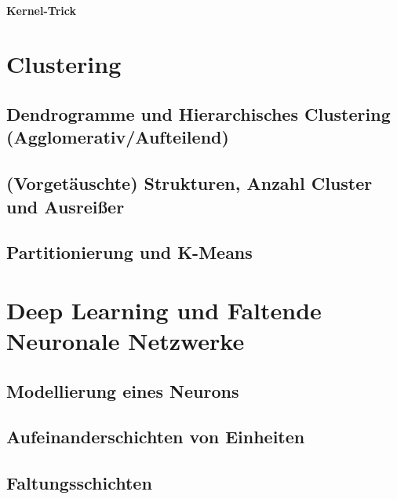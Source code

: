 			\subsubsection{Kernel-Trick} %

\chapter{Clustering} %

	\section{Dendrogramme und Hierarchisches Clustering (Agglomerativ/Aufteilend)} %

	\section{(Vorgetäuschte) Strukturen, Anzahl Cluster und Ausreißer} %

	\section{Partitionierung und K-Means} %

\chapter{Deep Learning und Faltende Neuronale Netzwerke} %

	\section{Modellierung eines Neurons} %

	\section{Aufeinanderschichten von Einheiten} %

	\section{Faltungsschichten} %


